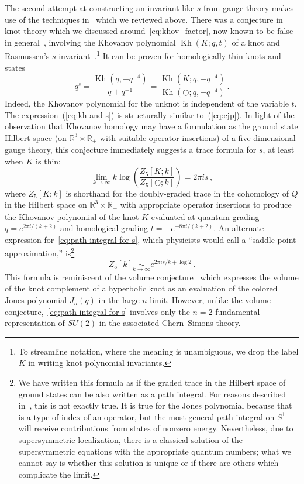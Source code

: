 \documentclass[11pt]{article}
\DeclareMathOperator{\Kh}{Kh}
\newcommand\eref[1]{(\ref{#1})}
\numberwithin{equation}{section}
\begin{document}
The second attempt at constructing an invariant like $s$ from gauge theory makes use of the techniques in~\cite{Witten:2011zz} which we reviewed above.
There was a conjecture in knot theory which we discussed around~\eqref{eq:khov_factor}, now known to be false in general~\cite{manolescu2018knight}, involving the Khovanov polynomial $\Kh(K; q,t)$ of a knot and Rasmussen's $s$-invariant~\cite{freedman2010man}.\footnote{
To streamline notation, where the meaning is unambiguous, we drop the label $K$ in writing knot polynomial invariants.}
It can be proven for homologically thin knots and states
\begin{equation}
    q^s = \frac{\Kh(q,-q^{-4})}{q+q^{-1}} = \frac{\Kh(K;q,-q^{-4})}{\Kh(\bigcirc; q,-q^{-4})} \,.
    \label{eq:kh-and-s}
\end{equation}
Indeed, the Khovanov polynomial for the unknot is independent of the  variable $t$. 
The expression~\eref{eq:kh-and-s} is structurally similar to~\eref{eq:cjp}.
In light of the observation that Khovanov homology may have a formulation as the ground state Hilbert space (on $\mathbb{R}^3 \times \mathbb{R}_+$ with suitable operator insertions) of a five-dimensional gauge theory, this conjecture immediately suggests a trace formula for $s$, at least when $K$ is thin:
\begin{equation}
    \lim_{k\to\infty} k \log \left( \frac{Z_5[K;k]}{Z_5[\bigcirc;k]} \right) = 2\pi i s  \,,
\label{eq:path-integral-for-s}
\end{equation}
where $Z_5[K;k]$ is shorthand for the doubly-graded trace in the cohomology of $Q$ in the Hilbert space on $\mathbb{R}^3 \times \mathbb{R}_+$ with appropriate operator insertions to produce the Khovanov polynomial of the knot $K$ evaluated at quantum grading $q = e^{2\pi i / (k+2)}$ and homological grading $t = -e^{-8\pi i / (k+2)}$.
An alternate expression for~\eqref{eq:path-integral-for-s}, which physicists would call a ``saddle point approximation,'' is\footnote{We have written this formula as if the graded trace in the Hilbert space of ground states can be also written as a path integral.
For reasons described in~\cite{Witten:2011zz}, this is not exactly true.
It is true for the Jones polynomial because that is a type of index of an operator, but the most general path integral on $S^1$ will receive contributions from states of nonzero energy.
Nevertheless, due to supersymmetric localization, there is a classical solution of the supersymmetric equations with the appropriate quantum numbers; what we cannot say is whether this solution is unique or if there are others which complicate the limit.}
\begin{equation}
    Z_5[k] \underset{k\to\infty}{\sim} e^{2\pi i s / k + \log 2} \,.
\label{eq:saddle-point-for-s}
\end{equation}
This formula is reminiscent of the volume conjecture~\cite{Kashaev1997,Murakami2001,murakami2002kashaev, Gukov:2003na} which expresses the volume of the knot complement of a hyperbolic knot as an evaluation of the colored Jones polynomial $J_n(q)$ in the large-$n$ limit.
However, unlike the volume conjecture,~\eqref{eq:path-integral-for-s} involves only the $n=2$ fundamental representation of $SU(2)$ in the associated Chern--Simons theory.
\end{document}
